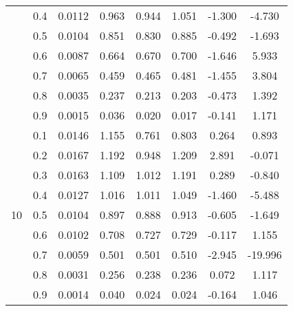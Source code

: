 \documentclass[11pt,a4paper]{report}
\begin{document}
\begin{longtable}{ | c | c || c | c | c | c | c | c | }
 & 0.4 & 0.0112 & 0.963 & 0.944 & 1.051 & -1.300 & -4.730 \\
 & 0.5 & 0.0104 & 0.851 & 0.830 & 0.885 & -0.492 & -1.693 \\
 & 0.6 & 0.0087 & 0.664 & 0.670 & 0.700 & -1.646 & 5.933 \\
 & 0.7 & 0.0065 & 0.459 & 0.465 & 0.481 & -1.455 & 3.804 \\
 & 0.8 & 0.0035 & 0.237 & 0.213 & 0.203 & -0.473 & 1.392 \\
 & 0.9 & 0.0015 & 0.036 & 0.020 & 0.017 & -0.141 & 1.171 \\
 \hline
\multirow{9}{*}{10} & 0.1 & 0.0146 & 1.155 & 0.761 & 0.803 & 0.264 & 0.893 \\
 & 0.2 & 0.0167 & 1.192 & 0.948 & 1.209 & 2.891 & -0.071 \\
 & 0.3 & 0.0163 & 1.109 & 1.012 & 1.191 & 0.289 & -0.840 \\
 & 0.4 & 0.0127 & 1.016 & 1.011 & 1.049 & -1.460 & -5.488 \\
 & 0.5 & 0.0104 & 0.897 & 0.888 & 0.913 & -0.605 & -1.649 \\
 & 0.6 & 0.0102 & 0.708 & 0.727 & 0.729 & -0.117 & 1.155 \\
 & 0.7 & 0.0059 & 0.501 & 0.501 & 0.510 & -2.945 & -19.996 \\
 & 0.8 & 0.0031 & 0.256 & 0.238 & 0.236 & 0.072 & 1.117 \\
 & 0.9 & 0.0014 & 0.040 & 0.024 & 0.024 & -0.164 & 1.046 \\
 \hline
\hline
\end{longtable}
\end{document}
